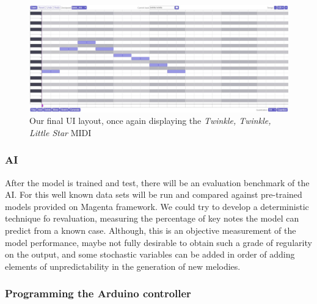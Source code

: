 \begin{figure}[h!]
  \centering
  \includegraphics[width=\linewidth]{image/FinalUI.png}
  \caption{Our final UI layout, once again displaying the \textit{Twinkle, Twinkle, Little Star} MIDI}
  \label{fig:soundtrap}
\end{figure}

\subsubsection{AI}

After the model is trained and test, there will be an evaluation benchmark of the AI. For
this well known data sets will be run and compared against pre-trained models provided on
Magenta framework. We could try to develop a deterministic technique fo revaluation,
measuring the percentage of key notes the model can predict from a known case. Although,
this is an objective measurement of the model performance, maybe not fully desirable to
obtain such a grade of regularity on the output, and some stochastic variables can be
added in order of adding elements of unpredictability in the generation of new melodies.

\subsubsection{Programming the Arduino controller}

